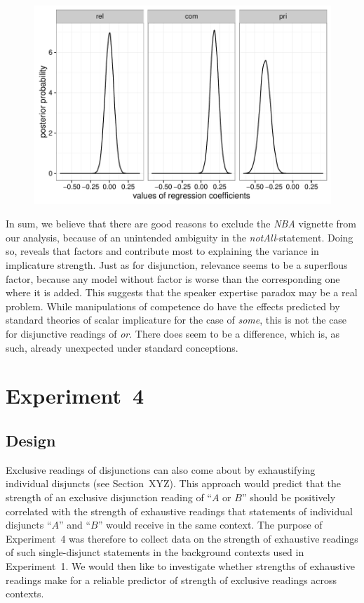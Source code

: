 \documentclass[12pt]{article}
\begin{document}
\begin{figure}
  \centering
  \includegraphics[width = 0.8 \textwidth]{pics/densityMCMCExp3.pdf}
  \caption{}
  \label{fig:BFsExp3noNBA_regressionCoefficients}
\end{figure}

In sum, we believe that there are good reasons to exclude the \emph{NBA} vignette from our
analysis, because of an unintended ambiguity in the \emph{notAll}-statement. Doing so, reveals
that factors \pri and \com contribute most to explaining the variance in implicature
strength. Just as for disjunction, relevance seems to be a superflous factor, because any model
without factor \rel is worse than the corresponding one where it is added. This suggests that
the speaker expertise paradox  may be a real problem. While manipulations of
competence do have the effects predicted by standard theories of scalar implicature for the
case of \emph{some}, this is not the case for disjunctive readings of \emph{or}. There does
seem to be a difference, which is, as such, already unexpected under standard conceptions.


\section{Experiment~4}

\subsection{Design}

Exclusive readings of disjunctions can also come about by exhaustifying individual disjuncts
(see Section~XYZ). This approach would predict that the strength of an exclusive disjunction
reading of ``$A$ or $B$'' should be positively correlated with the strength of exhaustive
readings that statements of individual disjuncts ``$A$'' and ``$B$'' would receive in the same
context. The purpose of Experiment~4 was therefore to collect data on the strength of
exhaustive readings of such single-disjunct statements in the background contexts used in
Experiment~1. We would then like to investigate whether strengths of exhaustive readings make
for a reliable predictor of strength of exclusive readings across contexts.
\end{document}
